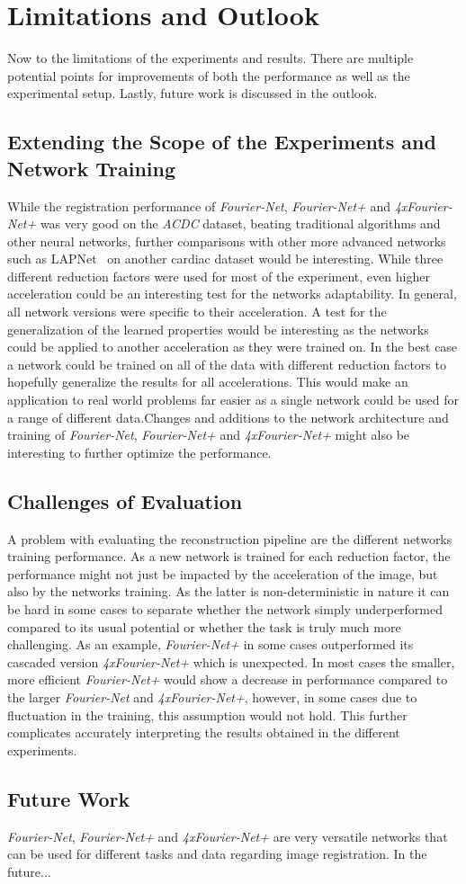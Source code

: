 \section{Limitations and Outlook}
Now to the limitations of the experiments and results. There are multiple potential points for improvements of both the performance as well as the experimental setup. Lastly, future work is discussed in the outlook.

\subsection{Extending the Scope of the Experiments and Network Training} 
While the registration performance of \emph{Fourier-Net}, \emph{Fourier-Net+} and \emph{4xFourier-Net+} was very good on the \emph{ACDC} dataset, beating traditional algorithms and other neural networks, further comparisons with other more advanced networks such as LAPNet~\cite{LAPNet} on another cardiac dataset would be interesting. While three different reduction factors were used for most of the experiment, even higher acceleration could be an interesting test for the networks adaptability. In general, all network versions were specific to their acceleration. A test for the generalization of the learned properties would be interesting as the networks could be applied to another acceleration as they were trained on. In the best case a network could be trained on all of the data with different reduction factors to hopefully generalize the results for all accelerations. This would make an application to real world problems far easier as a single network could be used for a range of different data.Changes and additions to the network architecture and training of \emph{Fourier-Net}, \emph{Fourier-Net+} and \emph{4xFourier-Net+} might also be interesting to further optimize the performance.

\subsection{Challenges of Evaluation}
A problem with evaluating the reconstruction pipeline are the different networks training performance. As a new network is trained for each reduction factor, the performance might not just be impacted by the acceleration of the image, but also by the networks training. As the latter is non-deterministic in nature it can be hard in some cases to separate whether the network simply underperformed compared to its usual potential or whether the task is truly much more challenging. As an example, \emph{Fourier-Net+} in some cases outperformed its cascaded version \emph{4xFourier-Net+} which is unexpected. In most cases the smaller, more efficient \emph{Fourier-Net+} would show a decrease in performance compared to the larger \emph{Fourier-Net} and \emph{4xFourier-Net+}, however, in some cases due to fluctuation in the training, this assumption would not hold. This further complicates accurately interpreting the results obtained in the different experiments.

\subsection{Future Work}
\emph{Fourier-Net}, \emph{Fourier-Net+} and \emph{4xFourier-Net+} are very versatile networks that can be used for different tasks and data regarding image registration. In the future... 